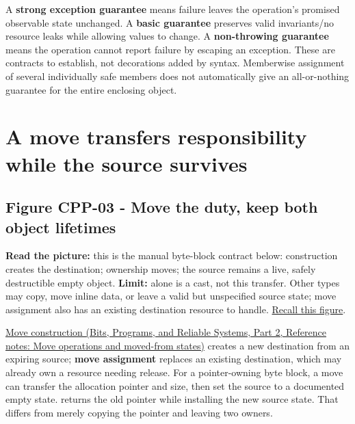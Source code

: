 A \textbf{strong exception guarantee} means failure leaves the operation's promised observable state unchanged. A \textbf{basic guarantee} preserves valid invariants/no resource leaks while allowing values to change. A \textbf{non-throwing guarantee} means the operation cannot report failure by escaping an exception. These are contracts to establish, not decorations added by syntax. Memberwise assignment of several individually safe members does not automatically give an all-or-nothing guarantee for the entire enclosing object.

\section{A move transfers responsibility while the source survives}\label{05-engine-i-ch003-a-move-transfers-responsibility-while-the-source-survives}

\hypertarget{05-engine-i-ch003-a-move-transfers-responsibility-while-the-source-survives}{}

\subsection{Figure CPP-03 - Move the duty, keep both object lifetimes}\label{05-engine-i-ch003-figure-cpp-03---move-the-duty-keep-both-object-lifetimes}

\hypertarget{05-engine-i-ch003-figure-cpp-03---move-the-duty-keep-both-object-lifetimes}{}


\textbf{Read the picture:} this is the manual byte-block contract below: construction creates the destination; ownership moves; the source remains a live, safely destructible empty object. \textbf{Limit:}  alone is a cast, not this transfer. Other types may copy, move inline data, or leave a valid but unspecified source state; move assignment also has an existing destination resource to handle. \hyperref[appendix-960160274237-four-figure-briefs]{Recall this figure}.

\href{../01-Bits-Programs-and-Reliable-Systems-P02/main.pdf\#appendix-5636651017c2}{Move construction (Bits, Programs, and Reliable Systems, Part 2, Reference notes: Move operations and moved-from states)} creates a new destination from an expiring source; \textbf{move assignment} replaces an existing destination, which may already own a resource needing release. For a pointer-owning byte block, a move can transfer the allocation pointer and size, then set the source to a documented empty state.  returns the old pointer while installing the new source state. That differs from merely copying the pointer and leaving two owners.

